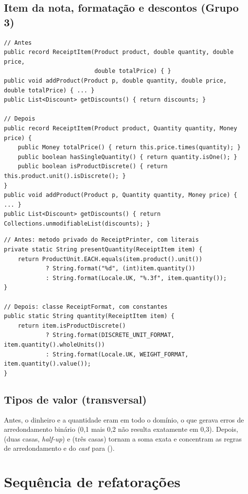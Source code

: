 \subsection{Item da nota, formatação e descontos (Grupo 3)}
\begin{lstlisting}
// Antes
public record ReceiptItem(Product product, double quantity, double price,
                          double totalPrice) { }
public void addProduct(Product p, double quantity, double price, double totalPrice) { ... }
public List<Discount> getDiscounts() { return discounts; }

// Depois
public record ReceiptItem(Product product, Quantity quantity, Money price) {
    public Money totalPrice() { return this.price.times(quantity); }
    public boolean hasSingleQuantity() { return quantity.isOne(); }
    public boolean isProductDiscrete() { return this.product.unit().isDiscrete(); }
}
public void addProduct(Product p, Quantity quantity, Money price) { ... }
public List<Discount> getDiscounts() { return Collections.unmodifiableList(discounts); }
\end{lstlisting}
\begin{lstlisting}
// Antes: metodo privado do ReceiptPrinter, com literais
private static String presentQuantity(ReceiptItem item) {
    return ProductUnit.EACH.equals(item.product().unit())
            ? String.format("%d", (int)item.quantity())
            : String.format(Locale.UK, "%.3f", item.quantity());
}

// Depois: classe ReceiptFormat, com constantes
public static String quantity(ReceiptItem item) {
    return item.isProductDiscrete()
            ? String.format(DISCRETE_UNIT_FORMAT, item.quantity().wholeUnits())
            : String.format(Locale.UK, WEIGHT_FORMAT, item.quantity().value());
}
\end{lstlisting}

\subsection{Tipos de valor (transversal)}
Antes, o dinheiro e a quantidade eram  em todo o domínio, o que gerava erros de arredondamento binário (0,1 mais 0,2 não resulta exatamente em 0,3). Depois,  (duas casas, \textit{half-up}) e  (três casas) tornam a soma exata e concentram as regras de arredondamento e do \textit{cast} para  ().

\section{Sequência de refatorações}

